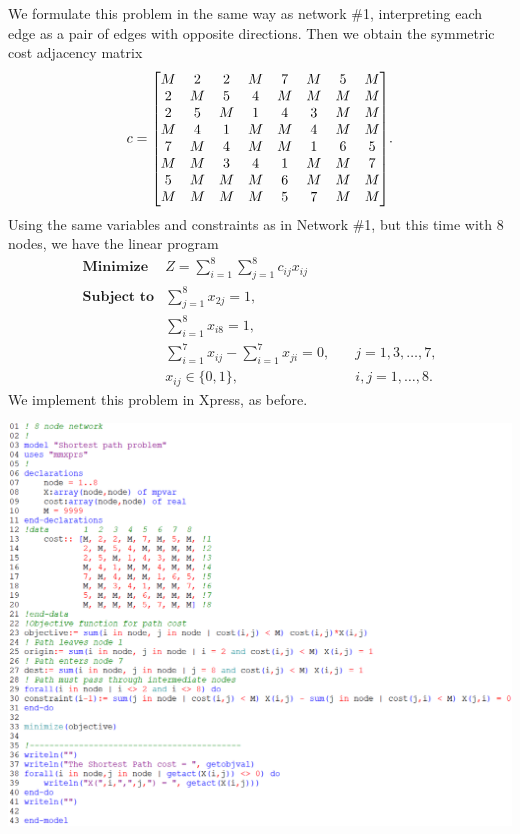 \documentclass[12pt]{article}
\theoremstyle{definition}
\newcommand{\tsum}{\textstyle\sum\limits}
\begin{document}
We formulate this problem in the same way as network \#1, interpreting each edge as a pair of edges with opposite directions. Then we obtain the symmetric cost adjacency matrix
\[
    c = \mqty[
        M & 2 & 2 & M & 7 & M & 5 & M \\
        2 & M & 5 & 4 & M & M & M & M \\
        2 & 5 & M & 1 & 4 & 3 & M & M \\
        M & 4 & 1 & M & M & 4 & M & M \\
        7 & M & 4 & M & M & 1 & 6 & 5 \\
        M & M & 3 & 4 & 1 & M & M & 7 \\
        5 & M & M & M & 6 & M & M & M \\
        M & M & M & M & 5 & 7 & M & M
    ].
\]
Using the same variables and constraints as in Network \#1, but this time with $8$ nodes, we have the linear program
\[\begin{array}{lll}
    \textbf{Minimize} & Z = \tsum_{i=1}^{8} \tsum_{j=1}^{8} c_{ij}x_{ij} \\
    \textbf{Subject to} & \tsum_{j=1}^{8} x_{2j} = 1, \\
        & \tsum_{i=1}^{8} x_{i8} = 1, \\
        & \tsum_{i=1}^{7} x_{ij} - \tsum_{i=1}^{7} x_{ji} = 0, \quad &j = 1, 3, \dots, 7, \\
        & x_{ij} \in \{0, 1\}, \quad &i, j = 1, \dots, 8.
\end{array}\]
We implement this problem in Xpress, as before.

\begin{center}
    \includegraphics[width=\textwidth]{code4.png}
\end{center}
\end{document}
